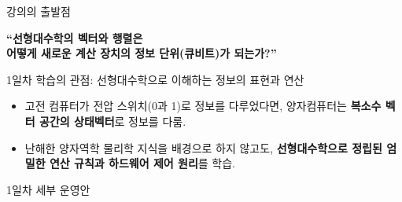 \documentclass[aspectratio=169, 10pt]{beamer}
\begin{document}
\begin{frame}{강의의 출발점}
    \pause
    \begin{center}
        \LARGE \textbf{``선형대수학의 벡터와 행렬은\\어떻게 새로운 계산 장치의 정보 단위(큐비트)가 되는가?''}
    \end{center}
    \pause
    \vspace{0.4cm}
    \begin{block}{1일차 학습의 관점: 선형대수학으로 이해하는 정보의 표현과 연산}
        \begin{itemize}
            \item 고전 컴퓨터가 전압 스위치(0과 1)로 정보를 다루었다면, 양자컴퓨터는 \textbf{복소수 벡터 공간의 상태벡터}로 정보를 다룸.\pause
            \item 난해한 양자역학 물리학 지식을 배경으로 하지 않고도, \textbf{선형대수학으로 정립된 엄밀한 연산 규칙과 하드웨어 제어 원리}를 학습.
        \end{itemize}
    \end{block}
\end{frame}

\begin{frame}{1일차 세부 운영안}
    \begin{center}
    \end{center}
\end{frame}
\end{document}
